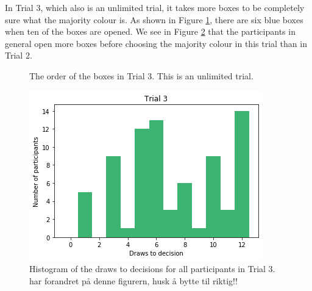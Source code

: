 In Trial 3, which also is an unlimited trial, it takes more boxes to be completely sure what the majority colour is. As shown in Figure \ref{fig:trial3_order}, there are six blue boxes when ten of the boxes are opened. We see in Figure \ref{fig:histogram_trial3} that the participants in general open more boxes before choosing the majority colour in this trial than in Trial 2. 

\begin{figure}
    \centering
    \scalebox{0.8}{}
    \caption[Order of boxes in Trial 3]{The order of the boxes in Trial 3. This is an unlimited trial.}
    \label{fig:trial3_order}
\end{figure}

\begin{figure}
    \centering
    \includegraphics[scale=0.6]{pictures/dtd3_histogram.png}
    \caption[Draws to decisions in Trial 3]{Histogram of the draws to decisions for all participants in Trial 3. 
    har forandret på denne figurern, husk å bytte til riktig!!}
    \label{fig:histogram_trial3}
\end{figure}


